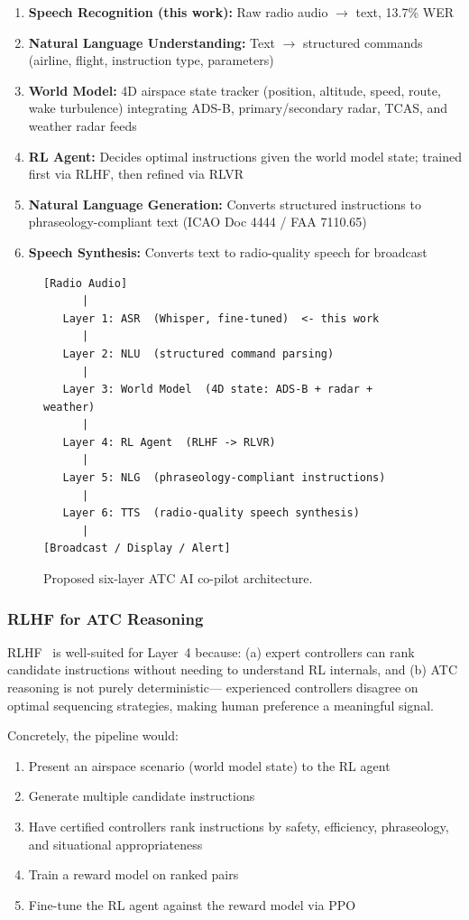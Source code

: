 \documentclass[11pt,a4paper]{article}
\begin{document}
\begin{enumerate}
  \item \textbf{Speech Recognition (this work):} Raw radio audio $\to$ text, 13.7\% WER
  \item \textbf{Natural Language Understanding:} Text $\to$ structured commands
        (airline, flight, instruction type, parameters)
  \item \textbf{World Model:} 4D airspace state tracker (position, altitude,
        speed, route, wake turbulence) integrating ADS-B, primary/secondary
        radar, TCAS, and weather radar feeds
  \item \textbf{RL Agent:} Decides optimal instructions given the world model
        state; trained first via RLHF, then refined via RLVR
  \item \textbf{Natural Language Generation:} Converts structured instructions
        to phraseology-compliant text (ICAO Doc 4444 / FAA 7110.65)
  \item \textbf{Speech Synthesis:} Converts text to radio-quality speech for
        broadcast
\end{enumerate}

\begin{figure}[h]
\centering
\begin{verbatim}
[Radio Audio]
      |
   Layer 1: ASR  (Whisper, fine-tuned)  <- this work
      |
   Layer 2: NLU  (structured command parsing)
      |
   Layer 3: World Model  (4D state: ADS-B + radar + weather)
      |
   Layer 4: RL Agent  (RLHF -> RLVR)
      |
   Layer 5: NLG  (phraseology-compliant instructions)
      |
   Layer 6: TTS  (radio-quality speech synthesis)
      |
[Broadcast / Display / Alert]
\end{verbatim}
\caption{Proposed six-layer ATC AI co-pilot architecture.}
\label{fig:architecture}
\end{figure}

\subsubsection{RLHF for ATC Reasoning}

RLHF~\cite{ouyang2022rlhf} is well-suited for Layer~4 because:
(a) expert controllers can rank candidate instructions without needing to
understand RL internals, and (b) ATC reasoning is not purely deterministic---
experienced controllers disagree on optimal sequencing strategies, making
human preference a meaningful signal.

Concretely, the pipeline would:
\begin{enumerate}[noitemsep]
  \item Present an airspace scenario (world model state) to the RL agent
  \item Generate multiple candidate instructions
  \item Have certified controllers rank instructions by safety, efficiency,
        phraseology, and situational appropriateness
  \item Train a reward model on ranked pairs
  \item Fine-tune the RL agent against the reward model via PPO~\cite{schulman2017ppo}
\end{enumerate}
\end{document}
